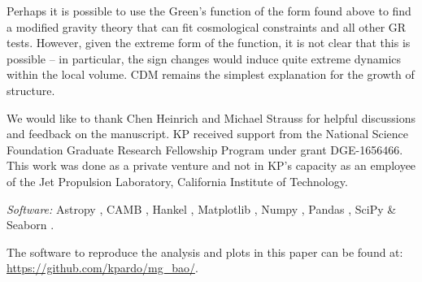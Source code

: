 \documentclass[12pt,floats,floatfix,showpacs,amssymb,amsmath,prl,superscriptaddress,nofootinbib, aps]{revtex4-2}
\newcommand{\kris}[1]{\textcolor{TealBlue}{[{\bf KP says}: #1]}}
\begin{document}

Perhaps it is possible to use the Green's function of the form found above to find a modified gravity theory that can fit cosmological constraints and all other GR tests. However, given the extreme form of the function, it is not clear that this is possible -- in particular, the sign changes would induce quite extreme dynamics within the local volume. CDM remains the simplest explanation for the growth of structure.

\acknowledgements
We would like to thank Chen Heinrich and Michael Strauss for helpful discussions and feedback on the manuscript. KP received support from the National Science Foundation Graduate Research Fellowship Program under grant DGE-1656466. This work was done as a private venture and not in KP's capacity as an employee of the Jet Propulsion Laboratory, California Institute of Technology.

\textit{Software:} Astropy \citep{astropy:2013, astropy:2018}, CAMB \citep{camb}, Hankel \citep{hankel}, Matplotlib \citep{Hunter:2007}, Numpy \citep{numpy}, Pandas \citep{pandas, mckinney-proc-scipy-2010}, SciPy \citep{scipy} \& Seaborn \citep{seaborn}.

The software to reproduce the analysis and plots in this paper can be found at: \url{https://github.com/kpardo/mg_bao/}.



\end{document}
